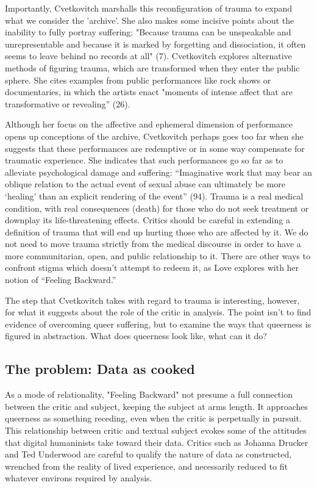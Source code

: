 \documentclass[11pt]{article}
\begin{document}
Importantly, Cvetkovitch marshalls this reconfiguration of trauma to
expand what we consider the 'archive'. She also makes some incisive
points about the inability to fully portray suffering: "Because trauma
can be unspeakable and unrepresentable and because it is marked by
forgetting and dissociation, it often seems to leave behind no records
at all" (7). Cvetkovitch explores alternative methods of figuring
trauma, which are transformed when they enter the public sphere. She
cites examples from public performances like rock shows or
documentaries, in which the artists enact "moments of intense affect
that are transformative or revealing” (26). 

Although her focus on the affective and ephemeral dimension of
performance opens up conceptions of the archive, Cvetkovitch perhaps
goes too far when she suggests that these performances are redemptive
or in some way compensate for traumatic experience. She indicates that
such performances go so far as to alleviate psychological damage and
suffering: “Imaginative work that may bear an oblique relation to the
actual event of sexual abuse can ultimately be more ‘healing’ than an
explicit rendering of the event” (94). Trauma is a real medical
condition, with real consequences (death) for those who do not seek
treatment or downplay its life-threatening effects. Critics should be
careful in extending a definition of trauma that will end up hurting
those who are affected by it. We do not need to move trauma strictly
from the medical discourse in order to have a more communitarian,
open, and public relationship to it. There are other ways to confront
stigma which doesn’t attempt to redeem it, as Love explores with her
notion of “Feeling Backward.”

The step that Cvetkovitch takes with regard to trauma is interesting,
however, for what it suggests about the role of the critic in
analysis. The point isn't to find evidence of overcoming queer
suffering, but to examine the ways that queerness is figured in
abstraction. What does queerness look like, what can it do? 


\subsection{The problem: Data as cooked}
\label{sec:org01f241f}
As a mode of relationality, "Feeling Backward" not presume a full
connection between the critic and subject, keeping the subject at arms
length. It approaches queerness as something receding, even when the
critic is perpetually in pursuit. This relationship between critic and
textual subject evokes some of the attitudes that digital humaninists
take toward their data. Critics such as Johanna Drucker and Ted
Underwood are careful to qualify the nature of data as constructed,
wrenched from the reality of lived experience, and necessarily reduced
to fit whatever environs required by analysis.
\end{document}
